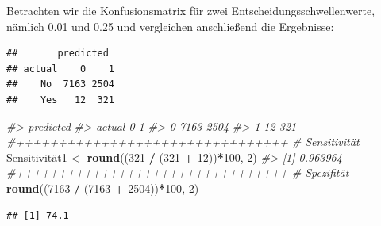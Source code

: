 \documentclass[
]{article}
\newenvironment{Shaded}{\begin{snugshade}}{\end{snugshade}}
\newcommand{\AttributeTok}[1]{\textcolor[rgb]{0.13,0.29,0.53}{#1}}
\newcommand{\CommentTok}[1]{\textcolor[rgb]{0.56,0.35,0.01}{\textit{#1}}}
\newcommand{\DecValTok}[1]{\textcolor[rgb]{0.00,0.00,0.81}{#1}}
\newcommand{\FunctionTok}[1]{\textcolor[rgb]{0.13,0.29,0.53}{\textbf{#1}}}
\newcommand{\NormalTok}[1]{#1}
\newcommand{\OtherTok}[1]{\textcolor[rgb]{0.56,0.35,0.01}{#1}}
\newcommand{\SpecialCharTok}[1]{\textcolor[rgb]{0.81,0.36,0.00}{\textbf{#1}}}
\begin{document}
Betrachten wir die Konfusionsmatrix für zwei Entscheidungsschwellenwerte, nämlich 0.01 und 0.25 und vergleichen anschließend die Ergebnisse:

\begin{Shaded}
\end{Shaded}

\begin{verbatim}
##       predicted
## actual    0    1
##    No  7163 2504
##    Yes   12  321
\end{verbatim}

\begin{Shaded}
\begin{Highlighting}[]
  \CommentTok{\#\textgreater{}       predicted}
  \CommentTok{\#\textgreater{} actual    0    1}
  \CommentTok{\#\textgreater{}      0 7163 2504}
  \CommentTok{\#\textgreater{}      1   12  321}
  \CommentTok{\#++++++++++++++++++++++++++++++++}
  \CommentTok{\# Sensitivität}
\NormalTok{  Sensitivität1 }\OtherTok{\textless{}{-}} \FunctionTok{round}\NormalTok{((}\DecValTok{321} \SpecialCharTok{/}\NormalTok{ (}\DecValTok{321} \SpecialCharTok{+} \DecValTok{12}\NormalTok{))}\SpecialCharTok{*}\DecValTok{100}\NormalTok{, }\DecValTok{2}\NormalTok{)}
  \CommentTok{\#\textgreater{} [1] 0.963964}
  \CommentTok{\#++++++++++++++++++++++++++++++++  }
  \CommentTok{\# Spezifität}
  \FunctionTok{round}\NormalTok{((}\DecValTok{7163} \SpecialCharTok{/}\NormalTok{ (}\DecValTok{7163} \SpecialCharTok{+} \DecValTok{2504}\NormalTok{))}\SpecialCharTok{*}\DecValTok{100}\NormalTok{, }\DecValTok{2}\NormalTok{)}
\end{Highlighting}
\end{Shaded}

\begin{verbatim}
## [1] 74.1
\end{verbatim}

\begin{Shaded}
\end{Shaded}
\end{document}
